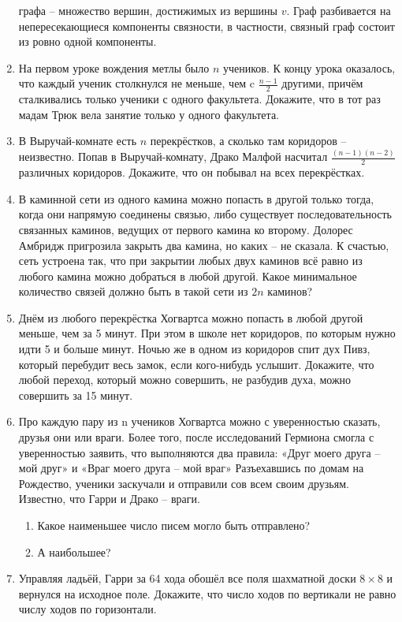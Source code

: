 \begin{enumerate}
 графа -- множество вершин, достижимых из вершины $v$. Граф
разбивается на непересекающиеся компоненты связности, в частности, связный граф состоит из ровно
одной компоненты.
\item На первом уроке вождения метлы было $n$ учеников. К концу урока оказалось, что каждый
ученик столкнулся не меньше, чем c $\frac{n - 1}{2}$ другими, причём сталкивались только ученики с одного
факультета. Докажите, что в тот раз мадам Трюк вела занятие только у одного факультета.
\item В Выручай-комнате есть $n$ перекрёстков, а сколько там коридоров -- неизвестно. Попав в
Выручай-комнату, Драко Малфой насчитал $\frac{(n - 1)(n - 2)}{2}$ различных коридоров. Докажите, что он побывал на
всех перекрёстках.
\item В каминной сети из одного камина можно попасть в другой только тогда, когда они напрямую
соединены связью, либо существует последовательность связанных каминов, ведущих от первого камина ко
второму. Долорес Амбридж пригрозила закрыть два камина, но каких -- не сказала. К счастью, сеть
устроена так, что при закрытии любых двух каминов всё равно из любого камина можно добраться в любой
другой. Какое минимальное количество связей должно быть в такой сети из $2n$ каминов?
\item Днём из любого перекрёстка Хогвартса можно попасть в любой другой меньше, чем за 5 минут.
При этом в школе нет коридоров, по которым нужно идти 5 и больше минут. Ночью же в одном из
коридоров спит дух Пивз, который перебудит весь замок, если кого-нибудь услышит. Докажите, что любой
переход, который можно совершить, не разбудив духа, можно совершить за 15 минут.
\item Про каждую пару из n учеников Хогвартса можно с уверенностью сказать, друзья они или
враги. Более того, после исследований Гермиона смогла с уверенностью заявить, что выполняются два
правила: «Друг моего друга – мой друг» и «Враг моего друга – мой враг» Разъехавшись по домам на
Рождество, ученики заскучали и отправили сов всем своим друзьям. Известно, что Гарри и Драко --
враги.
\begin{enumerate}
\item Какое наименьшее число писем могло быть отправлено?
\item А наибольшее?
\end{enumerate}
\item Управляя ладьёй, Гарри за 64 хода обошёл все поля шахматной доски $8 \times 8$ и вернулся на
исходное поле. Докажите, что число ходов по вертикали не равно числу ходов по горизонтали.

\end{enumerate}
